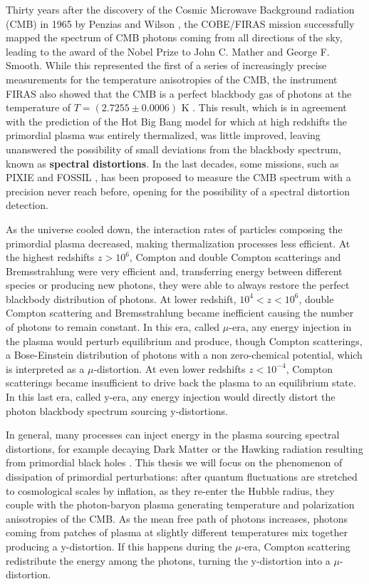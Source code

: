 Thirty years after the discovery of the Cosmic Microwave Background radiation (CMB) in 1965 by Penzias and Wilson \cite{1965ApJ...142..419P}, the COBE/FIRAS mission \cite{COBE1996} successfully mapped the spectrum of CMB photons coming from all directions of the sky, leading to the award of the Nobel Prize to John C. Mather and George F. Smooth. While this represented the first of a series of increasingly precise measurements for the temperature anisotropies of the CMB, the instrument FIRAS also showed that the CMB is a perfect blackbody gas of photons at the temperature of $T=(2.7255\pm0.0006)$ K \cite{COBE1996}. This result, which is in agreement with the prediction of the Hot Big Bang model for which at high redshifts the primordial plasma was entirely thermalized, was little improved, leaving unanswered the possibility of small deviations from the blackbody spectrum, known as \textbf{spectral distortions}. In the last decades, some missions, such as PIXIE \cite{pixie} and FOSSIL \cite{IAS_Fossil}, has been proposed to measure the CMB spectrum with a precision never reach before, opening for the possibility of a spectral distortion detection.

As the universe cooled down, the interaction rates of particles composing the primordial plasma decreased, making thermalization processes less efficient. At the highest redshifts $z>10^{6}$, Compton and double Compton scatterings and Bremsstrahlung were very efficient and, transferring energy between different species or producing new photons, they were able to always restore the perfect blackbody distribution of photons. At lower redshift, $10^{4}<z<10^{6}$, double Compton scattering and Bremsstrahlung became inefficient causing the number of photons to remain constant. In this era, called $\mu$-era, any energy injection in the plasma would perturb equilibrium and produce, though Compton scatterings, a Bose-Einstein distribution of photons with a non zero-chemical potential, which is interpreted as a $\mu$-distortion. At even lower redshifts $z<10^{-4}$, Compton scatterings became insufficient to drive back the plasma to an equilibrium state. In this last era, called y-era, any energy injection would directly distort the photon blackbody spectrum sourcing y-distortions.

In general, many processes can inject energy in the plasma sourcing spectral distortions, for example decaying Dark Matter or the Hawking radiation resulting from primordial black holes \cite{Lucca_2020}. This thesis we will focus on the phenomenon of dissipation of primordial perturbations: after quantum fluctuations are stretched to cosmological scales by inflation, as they re-enter the Hubble radius, they couple with the photon-baryon plasma generating temperature and polarization anisotropies of the CMB. As the mean free path of photons increases, photons coming from patches of plasma at slightly different temperatures mix together producing a y-distortion. If this happens during the $\mu$-era, Compton scattering redistribute the energy among the photons, turning the y-distortion into a $\mu$-distortion.

